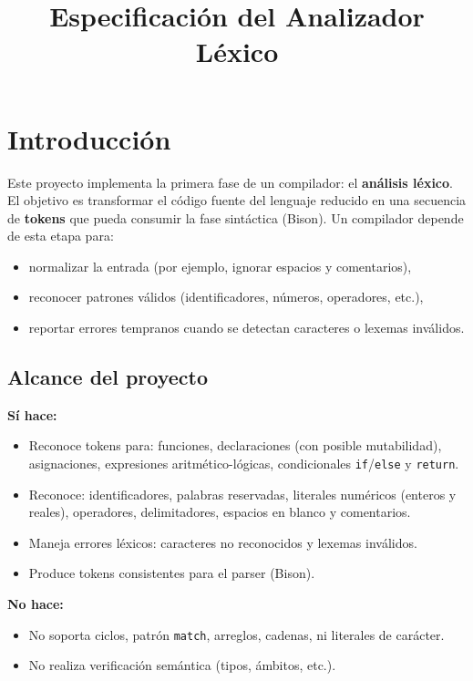 \documentclass[12pt]{article}
\title{Especificación del Analizador Léxico}
\author{}
\date{}
\begin{document}
\maketitle

\section{Introducción}
Este proyecto implementa la primera fase de un compilador: el \textbf{análisis léxico}. El objetivo es transformar el código fuente del lenguaje reducido en una secuencia de \textbf{tokens} que pueda consumir la fase sintáctica (Bison). Un compilador depende de esta etapa para:
\begin{itemize}[nosep]
  \item normalizar la entrada (por ejemplo, ignorar espacios y comentarios),
  \item reconocer patrones válidos (identificadores, números, operadores, etc.),
  \item reportar errores tempranos cuando se detectan caracteres o lexemas inválidos.
\end{itemize}

\subsection*{Alcance del proyecto}
\textbf{Sí hace:}
\begin{itemize}[nosep]
  \item Reconoce tokens para: funciones, declaraciones (con posible mutabilidad), asignaciones, expresiones aritmético-lógicas, condicionales \texttt{if}/\texttt{else} y \texttt{return}.
  \item Reconoce: identificadores, palabras reservadas, literales numéricos (enteros y reales), operadores, delimitadores, espacios en blanco y comentarios.
  \item Maneja errores léxicos: caracteres no reconocidos y lexemas inválidos.
  \item Produce tokens consistentes para el parser (Bison).
\end{itemize}

\textbf{No hace:}
\begin{itemize}[nosep]
  \item No soporta ciclos, patrón \texttt{match}, arreglos, cadenas, ni literales de carácter.
  \item No realiza verificación semántica (tipos, ámbitos, etc.).
\end{itemize}
\end{document}
